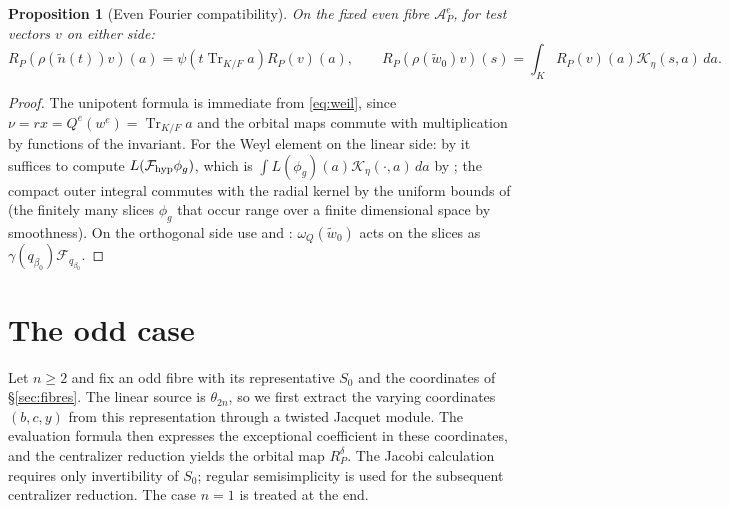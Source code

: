 \documentclass[11pt,oneside,notitlepage]{book}
\numberwithin{equation}{section}
\theoremstyle{plain}
\newtheorem{proposition}[theorem]{Proposition}
\theoremstyle{definition}
\newcommand{\Tr}{\operatorname{Tr}}
\begin{document}
\begin{proposition}[Even Fourier compatibility]\label{prop:even}
	On the fixed even fibre $\mathcal A_P^e$, for test vectors $v$ on either side:
	\[R_P(\rho(\tilde n(t))v)(a)=\psi(t\Tr_{K/F}a)R_P(v)(a),\qquad R_P(\rho(\tilde w_0)v)(s)=\int_KR_P(v)(a)\mathcal K_\eta(s,a)\,da .\]
\end{proposition}
\begin{proof}
	The unipotent formula is immediate from \eqref{eq:weil}, since $\nu=rx=Q^e(w^e)=\Tr_{K/F}a$ and the orbital maps commute with multiplication by functions of the invariant. For the Weyl element on the linear side: by  it suffices to compute $L(\mathcal F_{\rm hyp}\phi_g)$, which is $\int L(\phi_g)(a)\mathcal K_\eta(\cdot,a)\,da$ by ; the compact outer integral commutes with the radial kernel by the uniform bounds of  (the finitely many slices $\phi_g$ that occur range over a finite dimensional space by smoothness). On the orthogonal side use  and : $\omega_Q(\tilde w_0)$ acts on the slices as $\gamma(q_{\beta_0})\mathcal F_{q_{\beta_0}}$.
\end{proof}

\section{The odd case}\label{sec:odd}

Let $n\ge2$ and fix an odd fibre with its representative $S_0$ and the coordinates of \S\ref{sec:fibres}. The linear source is $\theta_{2n}$, so we first extract the varying coordinates $(b,c,y)$ from this representation through a twisted Jacquet module. The evaluation formula  then expresses the exceptional coefficient in these coordinates, and the centralizer reduction yields the orbital map $R_P^\delta$. The Jacobi calculation requires only invertibility of $S_0$; regular semisimplicity is used for the subsequent centralizer reduction. The case $n=1$ is treated at the end.
\end{document}
